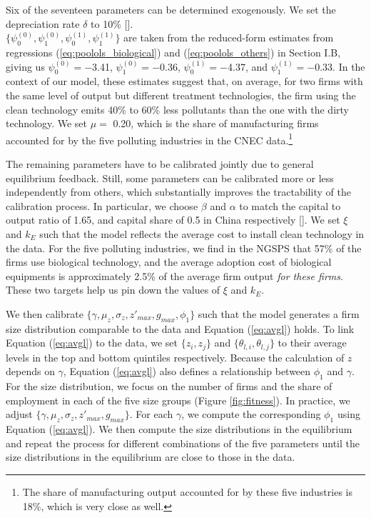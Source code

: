 \documentclass[AEJ]{AEA}
\begin{document}
Six of the seventeen parameters can be determined exogenously. We set the depreciation rate $\delta$ to 10\% [\citet{Songetal:2011}]. \\ $\{\psi_0^{(0)}, \psi_1^{(0)}, \psi_0^{(1)}, \psi_1^{(1)} \}$ are taken from the reduced-form estimates from regressions (\ref{eq:poolols_biological}) and (\ref{eq:poolols_others}) in Section I.B, giving us $\psi_0^{(0)} = -$3.41, $\psi_1^{(0)} = -$0.36, $\psi_0^{(1)} = -$4.37, and  $\psi_1^{(1)} = -$0.33. In the context of our model, these estimates suggest that, on average, for two firms with the same level of output but different treatment technologies, the firm using the clean technology emits 40\% to 60\% less pollutants than the one with the dirty technology. We set $\mu =$ 0.20, which is the share of manufacturing firms accounted for by the five polluting industries in the CNEC data.\footnote{The share of manufacturing output accounted for by these five industries is 18\%, which is very close as well.}

The remaining parameters have to be calibrated jointly due to general equilibrium feedback. Still, some parameters can be calibrated more or less independently from others, which substantially improves the tractability of the calibration process. In particular, we choose $\beta$ and $\alpha$ to match the capital to output ratio of 1.65, and capital share of 0.5 in China respectively [\citet{Baietal:2006}]. We set $\xi$ and $k_E$ such that the model reflects the average cost to install clean technology in the data. For the five polluting industries, we find in the NGSPS that 57\% of the firms use biological technology, and the average adoption cost of biological equipments is approximately 2.5\% of the average firm output \textit{for these firms}. These two targets help us pin down the values of $\xi$ and $k_E$.

We then calibrate $\{\gamma, \mu_z, \sigma_z, z'_{max}, g_{max}, \phi_1 \}$ such that the model generates a firm size distribution comparable to the data and Equation (\ref{eq:avgl}) holds. To link Equation (\ref{eq:avgl}) to the data, we set $\{z_i, z_j\}$ and $\{\theta_{l,i}, \theta_{l,j}\}$ to their average levels in the top and bottom quintiles respectively. Because the calculation of $z$ depends on $\gamma$, Equation (\ref{eq:avgl}) also defines a relationship between $\phi_1$ and $\gamma$. For the size distribution, we focus on the number of firms and the share of employment in each of the five size groups (Figure \ref{fig:fitness}). In practice, we adjust $\{\gamma, \mu_z, \sigma_z, z'_{max}, g_{max} \}$. For each $\gamma$, we compute the corresponding $\phi_1$ using Equation (\ref{eq:avgl}). We then compute the size distributions in the equilibrium and repeat the process for different combinations of the five parameters until the size distributions in the equilibrium are close to those in the data.
\end{document}
